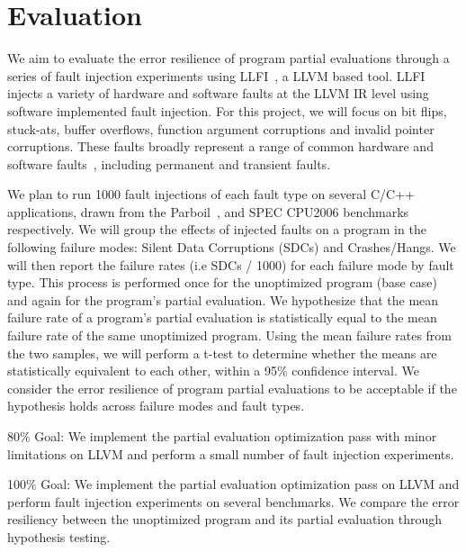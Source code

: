 \section{Evaluation}
\label{sec:evaluation}

We aim to evaluate the error resilience of program partial evaluations through a series of fault injection experiments using LLFI~\cite{LLFI}, a LLVM based tool.
LLFI injects a variety of hardware and software faults at the LLVM IR level using software implemented fault injection.
For this project, we will focus on bit flips, stuck-ats, buffer overflows, function argument corruptions and invalid pointer corruptions.
These faults broadly represent a range of common hardware and software faults~\cite{V2005}, including permanent and transient faults. 

We plan to run 1000 fault injections of each fault type on several C/C++ applications, drawn from the Parboil~\cite{Parboil}, and SPEC CPU2006 benchmarks~\cite{SPEC} respectively.
We will group the effects of injected faults on a program in the following failure modes: Silent Data Corruptions (SDCs) and Crashes/Hangs.
We will then report the failure rates (i.e SDCs / 1000) for each failure mode by fault type.
This process is performed once for the unoptimized program (base case) and again for the program’s partial evaluation.
We hypothesize that the mean failure rate of a program’s partial evaluation is statistically equal to the mean failure rate of the same unoptimized program.
Using the mean failure rates from the two samples, we will perform a t-test to determine whether the means are statistically equivalent to each other, within a 95\% confidence interval.
We consider the error resilience of program partial evaluations to be acceptable if the hypothesis holds across failure modes and fault types. 

80\% Goal: We implement the partial evaluation optimization pass with minor limitations on LLVM and perform a small number of fault injection experiments.

100\% Goal: We implement the partial evaluation optimization pass on LLVM and perform fault injection experiments on several benchmarks. We compare the error resiliency between the unoptimized program and its partial evaluation through hypothesis testing. 

